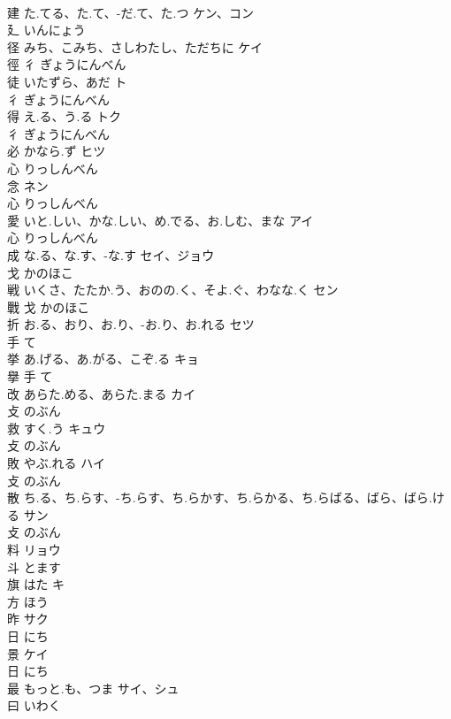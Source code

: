 \documentclass[8pt]{extreport}
\begin{document}
\begin{CJK}{UTF8}{min}
\\	建	た.てる、た.て、-だ.て、た.つ	ケン、コン	
\\	廴		いんにょう		
\\	径	みち、こみち、さしわたし、ただちに	ケイ	
\\	徑	彳		ぎょうにんべん		
\\	徒	いたずら、あだ	ト	
\\	彳		ぎょうにんべん		
\\	得	え.る、う.る	トク	
\\	彳		ぎょうにんべん		
\\	必	かなら.ず	ヒツ	
\\	心		りっしんべん		
\\	念		ネン	
\\	心		りっしんべん		
\\	愛	いと.しい、かな.しい、め.でる、お.しむ、まな	アイ	
\\	心		りっしんべん		
\\	成	な.る、な.す、-な.す	セイ、ジョウ	
\\	戈		かのほこ		
\\	戦	いくさ、たたか.う、おのの.く、そよ.ぐ、わなな.く	セン	
\\	戰	戈		かのほこ		
\\	折	お.る、おり、お.り、-お.り、お.れる	セツ	
\\	手		て		
\\	挙	あ.げる、あ.がる、こぞ.る	キョ	
\\	擧	手		て		
\\	改	あらた.める、あらた.まる	カイ	
\\	攴		のぶん		
\\	救	すく.う	キュウ	
\\	攴		のぶん		
\\	敗	やぶ.れる	ハイ	
\\	攴		のぶん		
\\	散	ち.る、ち.らす、-ち.らす、ち.らかす、ち.らかる、ち.らばる、ばら、ばら.ける	サン	
\\	攴		のぶん		
\\	料		リョウ	
\\	斗		とます		
\\	旗	はた	キ	
\\	方		ほう		
\\	昨		サク	
\\	日		にち		
\\	景		ケイ	
\\	日		にち		
\\	最	もっと.も、つま	サイ、シュ	
\\	曰		いわく		

\end{CJK}
\end{document}
